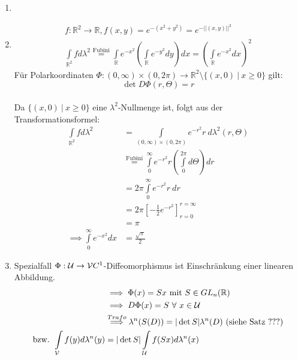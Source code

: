   \begin{example}
    \begin{enumerate}
      \item[]
      \item
        \begin{align*}
          f:\mathbb{R}^2 \to \mathbb{R}, f(x,y) = e^{-(x^2+y^2)} = e^{-||(x,y)||^2}\\
          \int\limits_{\mathbb{R}^2} f d\lambda^2 \stackrel{\text{Fubini}}{=} \int\limits_{\mathbb{R}} e^{-x^2}(\int\limits_{\mathbb{R}} e^{-y^2} dy) dx = (\int\limits_{\mathbb{R}} e^{-x^2} dx)^2
        \end{align*}
        Für Polarkoordinaten $\Phi:(0,\infty) \times (0,2\pi) \to \mathbb{R}^2 \setminus \{(x,0) \ | \ x \geq 0\}$ gilt: \\
        $$\det D\Phi(r,\Theta) = r$$\\
        Da $\{(x,0) \ | \ x \geq 0\}$ eine $\lambda^2$-Nullmenge ist, folgt aus der Transformationsformel:
        \begin{align*}
          \int\limits_{\mathbb{R}^2} f d\lambda^2
          &= \int\limits_{(0,\infty) \times (0,2\pi)} e^{-r^2} r \ d\lambda^2(r,\Theta)\\
          &\stackrel{\text{Fubini}}{=} \int\limits_0^{\infty} e^{-r^2}r(\int\limits_0^{2\pi}d\Theta)dr\\
          &= 2\pi \int\limits_0^{\infty} e^{-r^2} r \ dr\\
          &= 2\pi [-\frac{1}{2} e^{-r^2}]_{r=0}^{r=\infty}\\
          &= \pi\\
          \implies \int\limits_0^{\infty} e^{-x^2} dx &= \frac{\sqrt{\pi}}{2}
        \end{align*}
      \item Spezialfall $\Phi: \mathcal{U} \to \mathcal{V} C^1$-Diffeomorphismus ist Einschränkung einer linearen Abbildung.
        \begin{align*}
          &\implies \Phi(x) = Sx \text{ mit } S\in GL_n(\mathbb{R})\\
          &\implies D\Phi(x) = S \ \forall \ x \in \mathcal{U}\\
          &\stackrel{Trafo}{\implies} \lambda^n(S(D)) = |\det S| \lambda^n(D) \text{ (siehe Satz ???)}\\
          \text{bzw. } \int\limits_{\mathcal{V}} f(y) d\lambda^n(y) &= |\det S| \int\limits_{\mathcal{U}} f(Sx) d\lambda^n(x)
        \end{align*}

\end{enumerate}
\end{example}
